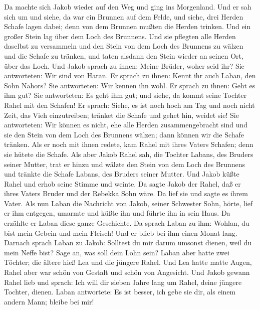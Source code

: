  Da machte sich Jakob wieder auf den Weg und ging ins
Morgenland.  Und er sah sich um und siehe, da war ein
Brunnen auf dem Felde, und siehe, drei Herden Schafe lagen dabei; denn
von dem Brunnen mußten die Herden trinken. Und ein großer Stein lag über
dem Loch des Brunnens.  Und sie pflegten alle Herden
daselbst zu versammeln und den Stein von dem Loch des Brunnens zu wälzen
und die Schafe zu tränken, und taten alsdann den Stein wieder an seinen
Ort, über das Loch.  Und Jakob sprach zu ihnen: Meine
Brüder, woher seid ihr? Sie antworteten: Wir sind von Haran.
 Er sprach zu ihnen: Kennt ihr auch Laban, den Sohn
Nahors? Sie antworteten: Wir kennen ihn wohl.  Er sprach
zu ihnen: Geht es ihm gut? Sie antworteten: Es geht ihm gut; und siehe,
da kommt seine Tochter Rahel mit den Schafen!  Er sprach:
Siehe, es ist noch hoch am Tag und noch nicht Zeit, das Vieh
einzutreiben; tränket die Schafe und gehet hin, weidet sie!
 Sie antworteten: Wir können es nicht, ehe alle Herden
zusammengebracht sind und sie den Stein von dem Loch des Brunnens
wälzen; dann können wir die Schafe tränken.  Als er noch
mit ihnen redete, kam Rahel mit ihres Vaters Schafen; denn sie hütete
die Schafe.  Als aber Jakob Rahel sah, die Tochter
Labans, des Bruders seiner Mutter, trat er hinzu und wälzte den Stein
von dem Loch des Brunnens und tränkte die Schafe Labans, des Bruders
seiner Mutter.  Und Jakob küßte Rahel und erhob seine
Stimme und weinte.  Da sagte Jakob der Rahel, daß er
ihres Vaters Bruder und der Rebekka Sohn wäre. Da lief sie und sagte es
ihrem Vater.  Als nun Laban die Nachricht von Jakob,
seiner Schwester Sohn, hörte, lief er ihm entgegen, umarmte und küßte
ihn und führte ihn in sein Haus. Da erzählte er Laban diese ganze
Geschichte.  Da sprach Laban zu ihm: Wohlan, du bist mein
Gebein und mein Fleisch! Und er blieb bei ihm einen Monat lang.
 Darnach sprach Laban zu Jakob: Solltest du mir darum
umsonst dienen, weil du mein Neffe bist? Sage an, was soll dein Lohn
sein?  Laban aber hatte zwei Töchter; die ältere hieß Lea
und die jüngere Rahel.  Und Lea hatte matte Augen, Rahel
aber war schön von Gestalt und schön von Angesicht.  Und
Jakob gewann Rahel lieb und sprach: Ich will dir sieben Jahre lang um
Rahel, deine jüngere Tochter, dienen.  Laban antwortete:
Es ist besser, ich gebe sie dir, als einem andern Mann; bleibe bei mir!
